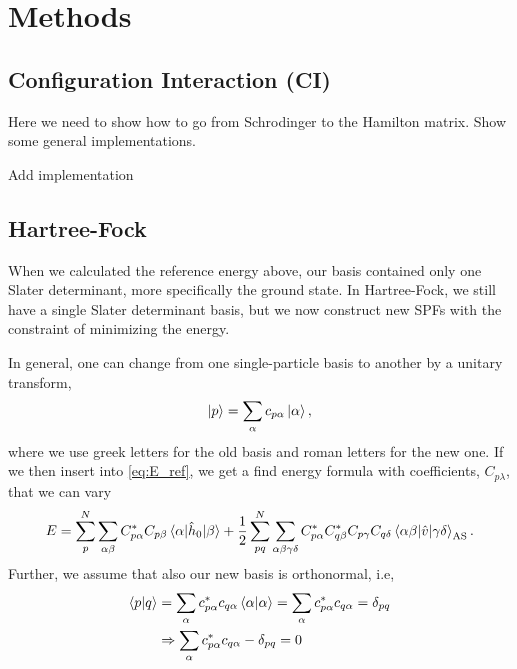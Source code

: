 \section{Methods} \label{sec:methods}

\subsection{Configuration Interaction (CI)}
Here we need to show how to go from Schrodinger to the Hamilton matrix. Show some general implementations.

Add implementation

\subsection{Hartree-Fock}
When we calculated the reference energy above, our basis contained only one Slater determinant, more specifically the ground state. In Hartree-Fock, we still have a single Slater determinant basis, but we now construct new SPFs with the constraint of minimizing the energy. 

In general, one can change from one single-particle basis to another by a unitary transform,
\begin{equation}
\ket{p}=\sum_{\alpha}c_{p\alpha}\ket{\alpha},
\end{equation}
where we use greek letters for the old basis and roman letters for the new one. If we then insert into \eqref{eq:E_ref}, we get a find energy formula with coefficients, $C_{p\lambda}$, that we can vary
\begin{equation}
E=\sum_{p}^N\sum_{\alpha\beta}C_{p\alpha}^*C_{p\beta}\mel{\alpha}{\hat{h}_0}{\beta}+\frac{1}{2}
\sum_{pq}^N\sum_{\alpha\beta\gamma\delta}C_{p\alpha}^*C_{q\beta}^*C_{p\gamma}C_{q\delta}\mel{\alpha\beta}{\hat{v}}{\gamma\delta}_{\text{AS}}.
\end{equation}
Further, we assume that also our new basis is orthonormal, i.e,
\begin{align}
\braket{p}{q}&=\sum_{\alpha}c_{p\alpha}^*c_{q\alpha}\braket{\alpha}{\alpha}=\sum_{\alpha}c_{p\alpha}^*c_{q\alpha}=\delta_{pq}\\
&\Rightarrow\sum_{\alpha}c_{p\alpha}^*c_{q\alpha}-\delta_{pq}=0\label{eq:constraint}
\end{align}

